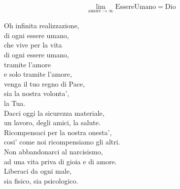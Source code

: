 \begin{vcentered}

    \begin{align*}
        &\lim_{\textrm{amore}\to\infty} \textrm{EssereUmano} = \textrm{Dio}
    \end{align*}

    \begin{poem}
        Oh infinita realizzazione,\\
        di ogni essere umano,\\
        che vive per la vita\\
        di ogni essere umano,\\
        tramite l'amore\\
        e solo tramite l'amore,\\
        venga il tuo regno di Pace,\\
        sia la nostra volonta',\\
        la Tua.\\
        Dacci oggi la sicurezza materiale,\\
        un lavoro, degli amici, la salute.\\
        Ricompensaci per la nostra onesta',\\
        cosi' come noi ricompensiamo gli altri.\\
        Non abbandonarci al narcisismo,\\
        ad una vita priva di gioia e di amore.\\
        Liberaci da ogni male,\\
        sia fisico, sia psicologico.\\
    \end{poem}

\end{vcentered}


